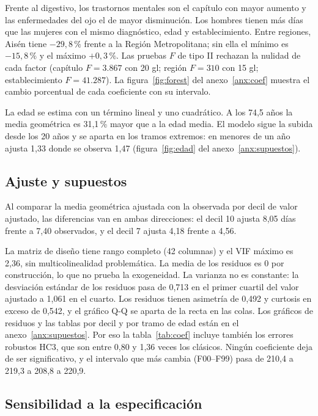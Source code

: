 \documentclass[10.5pt,a4paper,headings=small,abstract=false,bibliography=totoc,listof=totoc]{scrartcl}
\newcommand{\pct}{\,\%}
\newcommand{\anexo}[1]{anexo~\ref{#1}}
\begin{document}
Frente al digestivo, los trastornos mentales son el capítulo con mayor aumento y las enfermedades del ojo el de mayor disminución. Los hombres tienen más días que las mujeres con el mismo diagnóstico, edad y establecimiento. Entre regiones, Aisén tiene $-29{,}8\pct{}$ frente a la Región Metropolitana; sin ella el mínimo es $-15{,}8\pct{}$ y el máximo $+0{,}3\pct{}$. Las pruebas $F$ de tipo II rechazan la nulidad de cada factor (capítulo $F=3.867$ con 20 gl; región $F=310$ con 15 gl; establecimiento $F=41.287$). La figura~\ref{fig:forest} del \anexo{anx:coef} muestra el cambio porcentual de cada coeficiente con su intervalo.

La edad se estima con un término lineal y uno cuadrático. A los 74,5 años la media geométrica es 31,1\pct{} mayor que a la edad media. El modelo sigue la subida desde los 20 años y se aparta en los tramos extremos: en menores de un año ajusta 1,33 donde se observa 1,47 (figura~\ref{fig:edad} del \anexo{anx:supuestos}).

\subsection{Ajuste y supuestos}

Al comparar la media geométrica ajustada con la observada por decil de valor ajustado, las diferencias van en ambas direcciones: el decil 10 ajusta 8,05 días frente a 7,40 observados, y el decil 7 ajusta 4,18 frente a 4,56.

La matriz de diseño tiene rango completo (42 columnas) y el VIF máximo es 2,36, sin multicolinealidad problemática. La media de los residuos es 0 por construcción, lo que no prueba la exogeneidad. La varianza no es constante: la desviación estándar de los residuos pasa de 0,713 en el primer cuartil del valor ajustado a 1,061 en el cuarto. Los residuos tienen asimetría de 0,492 y curtosis en exceso de 0,542, y el gráfico Q-Q se aparta de la recta en las colas. Los gráficos de residuos y las tablas por decil y por tramo de edad están en el \anexo{anx:supuestos}. Por eso la tabla~\ref{tab:coef} incluye también los errores robustos HC3, que son entre 0,80 y 1,36 veces los clásicos. Ningún coeficiente deja de ser significativo, y el intervalo que más cambia (F00--F99) pasa de 210,4 a 219,3 a 208,8 a 220,9.

\subsection{Sensibilidad a la especificación}\label{sec:sens}
\end{document}
